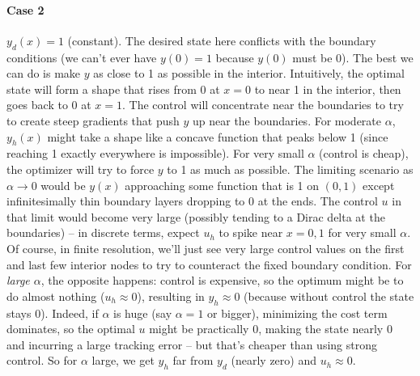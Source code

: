\documentclass[a4paper,10pt]{report}
\begin{document}
\paragraph{Case 2}
\(y_d(x)=1\) (constant).
The desired state here conflicts with the boundary conditions (we can't ever have \(y(0)=1\) because \(y(0)\) must be 0). The best we can do is make \(y\) as close to 1 as possible in the interior. Intuitively, the optimal state will form a shape that rises from 0 at \(x=0\) to near 1 in the interior, then goes back to 0 at \(x=1\). The control will concentrate near the boundaries to try to create steep gradients that push \(y\) up near the boundaries. For moderate \(\alpha\), \(y_h(x)\) might take a shape like a concave function that peaks below 1 (since reaching 1 exactly everywhere is impossible). For very small \(\alpha\) (control is cheap), the optimizer will try to force \(y\) to 1 as much as possible. The limiting scenario as \(\alpha \to 0\) would be \(y(x)\) approaching some function that is 1 on \((0,1)\) except infinitesimally thin boundary layers dropping to 0 at the ends. The control \(u\) in that limit would become very large (possibly tending to a Dirac delta at the boundaries) -- in discrete terms, expect \(u_h\) to spike near \(x=0,1\) for very small \(\alpha\). Of course, in finite resolution, we'll just see very large control values on the first and last few interior nodes to try to counteract the fixed boundary condition. For \emph{large \(\alpha\)}, the opposite happens: control is expensive, so the optimum might be to do almost nothing (\(u_h \approx 0\)), resulting in \(y_h \approx 0\) (because without control the state stays 0). Indeed, if \(\alpha\) is huge (say \(\alpha=1\) or bigger), minimizing the cost term dominates, so the optimal \(u\) might be practically 0, making the state nearly 0 and incurring a large tracking error – but that's cheaper than using strong control. So for \(\alpha\) large, we get \(y_h\) far from \(y_d\) (nearly zero) and \(u_h \approx 0\).
\end{document}
